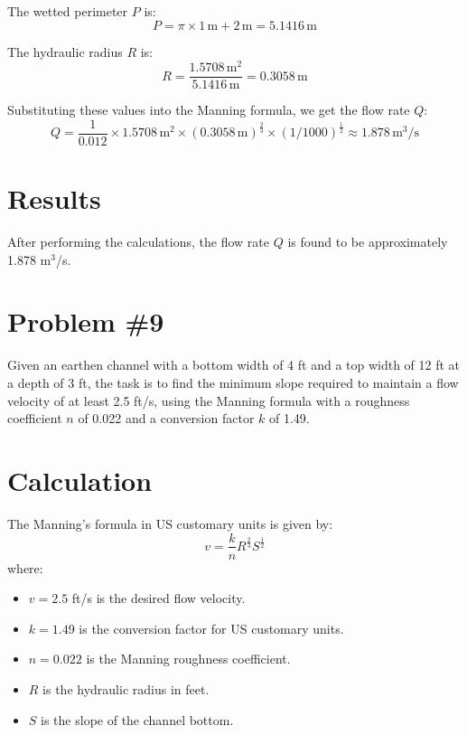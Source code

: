 \documentclass{article}
\begin{document}
The wetted perimeter \( P \) is:
\begin{equation}
    P = \pi \times 1\, \text{m} + 2\, \text{m} = 5.1416\, \text{m}
\end{equation}

The hydraulic radius \( R \) is:
\begin{equation}
    R = \frac{1.5708\, \text{m}^2}{5.1416\, \text{m}} = 0.3058\, \text{m}
\end{equation}

Substituting these values into the Manning formula, we get the flow rate \( Q \):
\begin{equation}
    Q = \frac{1}{0.012} \times 1.5708\, \text{m}^2 \times (0.3058\, \text{m})^{\frac{2}{3}} \times (1/1000)^{\frac{1}{2}} \approx 1.878\, \text{m}^3/\text{s}
\end{equation}

\section*{Results}
After performing the calculations, the flow rate \( Q \) is found to be approximately 1.878 m\(^3\)/s.
\newpage
\section*{Problem \#9}
Given an earthen channel with a bottom width of 4 ft and a top width of 12 ft at a depth of 3 ft, the task is to find the minimum slope required to maintain a flow velocity of at least 2.5 ft/s, using the Manning formula with a roughness coefficient \( n \) of 0.022 and a conversion factor \( k \) of 1.49.

\section*{Calculation}
The Manning's formula in US customary units is given by:
\begin{equation}
    v = \frac{k}{n} R^{\frac{2}{3}} S^{\frac{1}{2}}
\end{equation}
where:
\begin{itemize}
    \item \( v = 2.5 \) ft/s is the desired flow velocity.
    \item \( k = 1.49 \) is the conversion factor for US customary units.
    \item \( n = 0.022 \) is the Manning roughness coefficient.
    \item \( R \) is the hydraulic radius in feet.
    \item \( S \) is the slope of the channel bottom.
\end{itemize}
\end{document}

